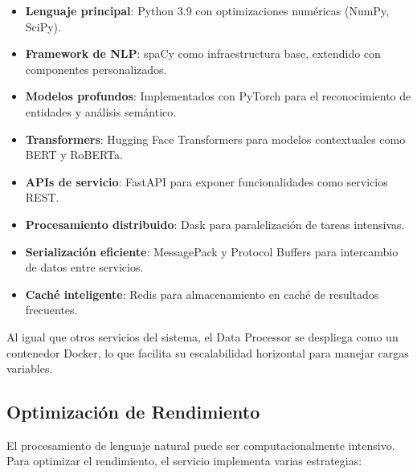 \documentclass[12pt,a4paper]{article}
\begin{document}
\begin{itemize}
    \item \textbf{Lenguaje principal}: Python 3.9 con optimizaciones numéricas (NumPy, SciPy).
    
    \item \textbf{Framework de NLP}: spaCy como infraestructura base, extendido con componentes personalizados.
    
    \item \textbf{Modelos profundos}: Implementados con PyTorch para el reconocimiento de entidades y análisis semántico.
    
    \item \textbf{Transformers}: Hugging Face Transformers para modelos contextuales como BERT y RoBERTa.
    
    \item \textbf{APIs de servicio}: FastAPI para exponer funcionalidades como servicios REST.
    
    \item \textbf{Procesamiento distribuido}: Dask para paralelización de tareas intensivas.
    
    \item \textbf{Serialización eficiente}: MessagePack y Protocol Buffers para intercambio de datos entre servicios.
    
    \item \textbf{Caché inteligente}: Redis para almacenamiento en caché de resultados frecuentes.
\end{itemize}

Al igual que otros servicios del sistema, el Data Processor se despliega como un contenedor Docker, lo que facilita su escalabilidad horizontal para manejar cargas variables.

\subsection{Optimización de Rendimiento}
\label{subsec:dp-rendimiento}

El procesamiento de lenguaje natural puede ser computacionalmente intensivo. Para optimizar el rendimiento, el servicio implementa varias estrategias:
\end{document}
